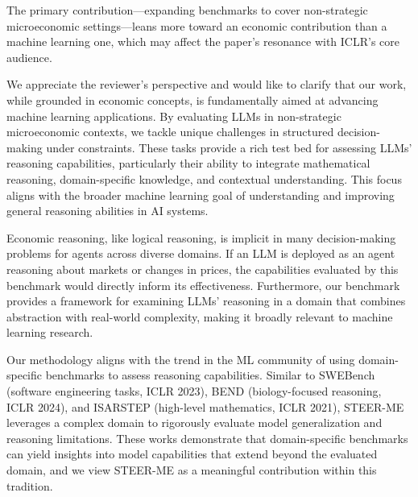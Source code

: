 \documentclass[12pt]{rebuttal_style}
\begin{document}
\begin{revcomment}
    The primary contribution—expanding benchmarks to cover non-strategic microeconomic settings—leans more toward an economic contribution than a machine learning one, which may affect the paper's resonance with ICLR's core audience.
\end{revcomment}
\begin{response}
We appreciate the reviewer’s perspective and would like to clarify that our work, while grounded in economic concepts, is fundamentally aimed at advancing machine learning applications. By evaluating LLMs in non-strategic microeconomic contexts, we tackle unique challenges in structured decision-making under constraints. These tasks provide a rich test bed for assessing LLMs' reasoning capabilities, particularly their ability to integrate mathematical reasoning, domain-specific knowledge, and contextual understanding. This focus aligns with the broader machine learning goal of understanding and improving general reasoning abilities in AI systems.

Economic reasoning, like logical reasoning, is implicit in many decision-making problems for agents across diverse domains. If an LLM is deployed as an agent reasoning about markets or changes in prices, the capabilities evaluated by this benchmark would directly inform its effectiveness. Furthermore, our benchmark provides a framework for examining LLMs’ reasoning in a domain that combines abstraction with real-world complexity, making it broadly relevant to machine learning research.

Our methodology aligns with the trend in the ML community of using domain-specific benchmarks to assess reasoning capabilities. Similar to SWEBench (software engineering tasks, ICLR 2023), BEND (biology-focused reasoning, ICLR 2024), and ISARSTEP (high-level mathematics, ICLR 2021), STEER-ME leverages a complex domain to rigorously evaluate model generalization and reasoning limitations. These works demonstrate that domain-specific benchmarks can yield insights into model capabilities that extend beyond the evaluated domain, and we view STEER-ME as a meaningful contribution within this tradition.
\end{response}
\end{document}
